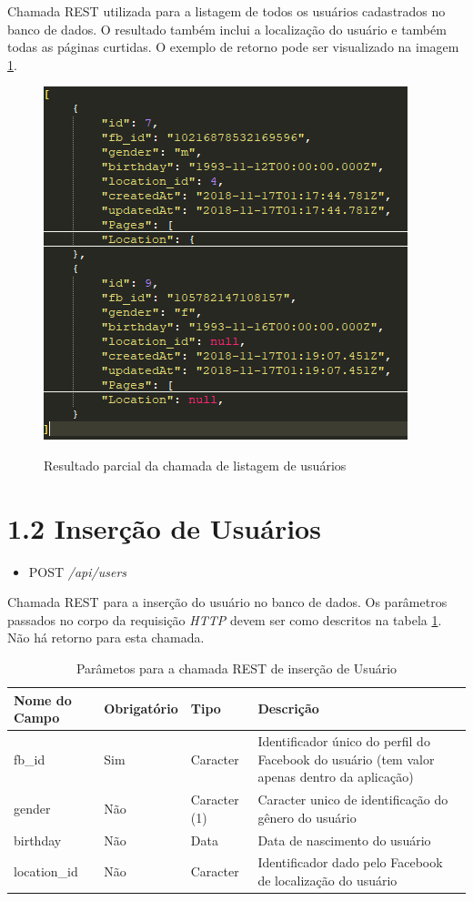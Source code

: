 \documentclass[
	12pt,				%
	oneside,			%
	a4paper,			%
	english,			%
	brazil				%
	]{abntex2ppgsi}
\begin{document}
\begin{apendicesenv}
Chamada REST utilizada para a listagem de todos os usuários cadastrados no banco de dados. O resultado também inclui a localização do usuário e também todas as páginas curtidas. O exemplo de retorno pode ser visualizado na imagem \ref{fig:retornoUsers}.

\begin{figure}[H]
	\centering
	\caption{Resultado parcial da chamada de listagem de usuários}
	\includegraphics[scale=1]{resultadoUsers.png}
	\label{fig:retornoUsers}
\end{figure}


\section*{1.2 Inserção de Usuários}

\begin{itemize}
	\item {POST} \textit{/api/users}
\end{itemize}

Chamada REST para a inserção do usuário no banco de dados. Os parâmetros passados no corpo da requisição \textit{HTTP} devem ser como descritos na tabela \ref{tab:tabelaBodyUsers}. Não há retorno para esta chamada.

 \begin{table}[htbp]
 	\centering
 	\caption{Parâmetos para a chamada REST de inserção de Usuário}
 	\begin{tabular}{p{1.5in} p{1in} p{1in} p{1.5in}  } \hline
 		Nome do Campo 		& 		Obrigatório 		& 		Tipo 		&		 Descrição \\ \hline
 		fb\_id				& 		Sim					&	Caracter		& Identificador único do perfil do Facebook do usuário (tem valor apenas dentro da aplicação) \\
 		gender				& 		Não					& Caracter (1)		& Caracter unico de identificação do gênero do usuário \\
 		birthday			& 		Não					& Data				& Data de nascimento do usuário \\
 		location\_id		& 		Não					& Caracter			& Identificador dado pelo Facebook de localização do usuário
 	\end{tabular}
  	\label{tab:tabelaBodyUsers}
 \end{table}


\end{apendicesenv}
\end{document}
